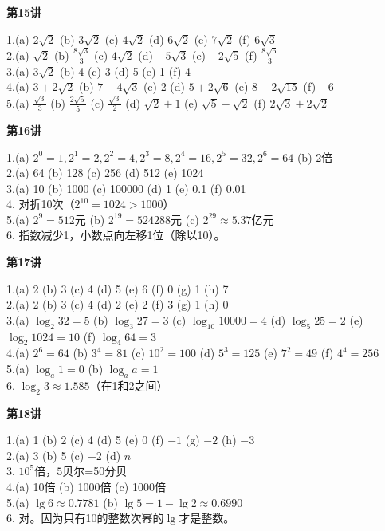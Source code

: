 \textbf{第15讲}

1.(a) $2\sqrt2$ \quad (b) $3\sqrt2$ \quad (c) $4\sqrt2$ \quad (d) $6\sqrt2$ \quad (e) $7\sqrt2$ \quad (f) $6\sqrt3$\\
2.(a) $\sqrt2$ \quad (b) $\frac{8\sqrt3}{3}$ \quad (c) $4\sqrt2$ \quad (d) $-5\sqrt3$ \quad (e) $-2\sqrt5$ \quad (f) $\frac{8\sqrt6}{3}$\\
3.(a) $3\sqrt2$ \quad (b) 4 \quad (c) 3 \quad (d) 5 \quad (e) 1 \quad (f) 4\\
4.(a) $3+2\sqrt2$ \quad (b) $7-4\sqrt3$ \quad (c) 2 \quad (d) $5+2\sqrt6$ \quad (e) $8-2\sqrt{15}$ \quad (f) $-6$\\
5.(a) $\frac{\sqrt3}{3}$ \quad (b) $\frac{2\sqrt5}{5}$ \quad (c) $\frac{\sqrt3}{2}$ \quad (d) $\sqrt2+1$ \quad (e) $\sqrt5-\sqrt2$ \quad (f) $2\sqrt3+2\sqrt2$


\textbf{第16讲}

1.(a) $2^0=1,2^1=2,2^2=4,2^3=8,2^4=16,2^5=32,2^6=64$ \quad (b) 2倍\\
2.(a) 64 \quad (b) 128 \quad (c) 256 \quad (d) 512 \quad (e) 1024\\
3.(a) 10 \quad (b) 1000 \quad (c) 100000 \quad (d) 1 \quad (e) 0.1 \quad (f) 0.01\\
4. 对折10次（$2^{10}=1024>1000$）\\
5.(a) $2^9=512$元 \quad (b) $2^{19}=524288$元 \quad (c) $2^{29}\approx5.37$亿元\\
6. 指数减少1，小数点向左移1位（除以10）。

\textbf{第17讲}

1.(a) 2 \quad (b) 3 \quad (c) 4 \quad (d) 5 \quad (e) 6 \quad (f) 0 \quad (g) 1 \quad (h) 7\\
2.(a) 2 \quad (b) 3 \quad (c) 4 \quad (d) 2 \quad (e) 2 \quad (f) 3 \quad (g) 1 \quad (h) 0\\
3.(a) $\log_2 32=5$ \quad (b) $\log_3 27=3$ \quad (c) $\log_{10}10000=4$ \quad (d) $\log_5 25=2$ \quad (e) $\log_2 1024=10$ \quad (f) $\log_4 64=3$\\
4.(a) $2^6=64$ \quad (b) $3^4=81$ \quad (c) $10^2=100$ \quad (d) $5^3=125$ \quad (e) $7^2=49$ \quad (f) $4^4=256$\\
5.(a) $\log_a 1=0$ \quad (b) $\log_a a=1$\\
6. $\log_2 3\approx1.585$（在1和2之间）

\textbf{第18讲}

1.(a) 1 \quad (b) 2 \quad (c) 4 \quad (d) 5 \quad (e) 0 \quad (f) $-1$ \quad (g) $-2$ \quad (h) $-3$\\
2.(a) 3 \quad (b) 5 \quad (c) $-2$ \quad (d) $n$\\
3. $10^5$倍，$5$贝尔=50分贝\\
4.(a) 10倍 \quad (b) 1000倍 \quad (c) 1000倍\\
5.(a) $\lg6\approx0.7781$ \quad (b) $\lg5=1-\lg2\approx0.6990$\\
6. 对。因为只有10的整数次幂的$\lg$才是整数。

